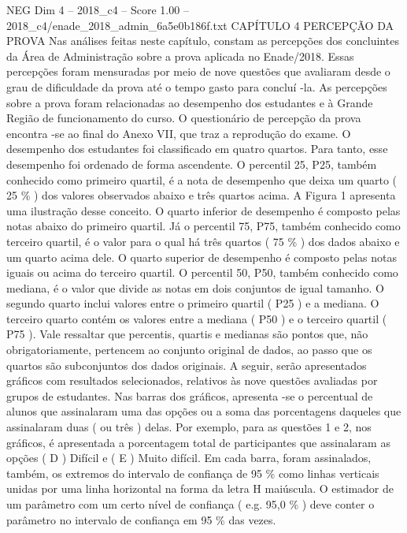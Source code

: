 \begin{textsample}{NEG Dim 4 – 2018\_c4 – Score 1.00 – 2018\_c4/enade\_2018\_admin\_6a5e0b186f.txt}  \label{ex:f4_neg_169}
CAPÍTULO 4 PERCEPÇÃO DA PROVA Nas análises feitas neste capítulo, constam as percepções dos concluintes da Área de Administração sobre a prova aplicada no Enade/2018.
Essas percepções foram mensuradas por meio de nove questões que avaliaram desde o grau de dificuldade da prova até o tempo gasto para concluí -la.
As percepções sobre a prova foram relacionadas ao desempenho dos estudantes e à Grande Região de funcionamento do curso.
O questionário de percepção da prova encontra -se ao final do Anexo VII, que traz a reprodução do exame.
O desempenho dos estudantes foi classificado em quatro quartos.
Para tanto, esse desempenho foi ordenado de forma ascendente.
O percentil 25, P25, também conhecido como primeiro quartil, é a nota de desempenho que deixa um quarto ( 25 \% ) dos valores observados abaixo e três quartos acima.
A Figura 1 apresenta uma ilustração desse conceito.
O quarto inferior de desempenho é composto pelas notas abaixo do primeiro quartil.
Já o percentil 75, P75, também conhecido como terceiro quartil, é o valor para o qual há três quartos ( 75 \% ) dos dados abaixo e um quarto acima dele.
O quarto superior de desempenho é composto pelas notas iguais ou acima do terceiro quartil.
O percentil 50, P50, também conhecido como mediana, é o valor que divide as notas em dois conjuntos de igual tamanho.
O segundo quarto inclui valores entre o primeiro quartil ( P25 ) e a mediana.
O terceiro quarto contém os valores entre a mediana ( P50 ) e o terceiro quartil ( P75 ).
Vale ressaltar que percentis, quartis e medianas são pontos que, não obrigatoriamente, pertencem ao conjunto original de dados, ao passo que os quartos são subconjuntos dos dados originais.
A seguir, serão apresentados gráficos com resultados selecionados, relativos às nove questões avaliadas por grupos de estudantes.
Nas barras dos gráficos, apresenta -se o percentual de alunos que assinalaram uma das opções ou a soma das porcentagens daqueles que assinalaram duas ( ou três ) delas.
Por exemplo, para as questões 1 e 2, nos gráficos, é apresentada a porcentagem total de participantes que assinalaram as opções ( D ) Difícil e ( E ) Muito difícil.
Em cada barra, foram assinalados, também, os extremos do intervalo de confiança de 95 \% como linhas verticais unidas por uma linha horizontal na forma da letra H maiúscula.
O estimador de um parâmetro com um certo nível de confiança ( e.g. 95,0 \% ) deve conter o parâmetro no intervalo de confiança em 95 \% das vezes.

\end{textsample}
